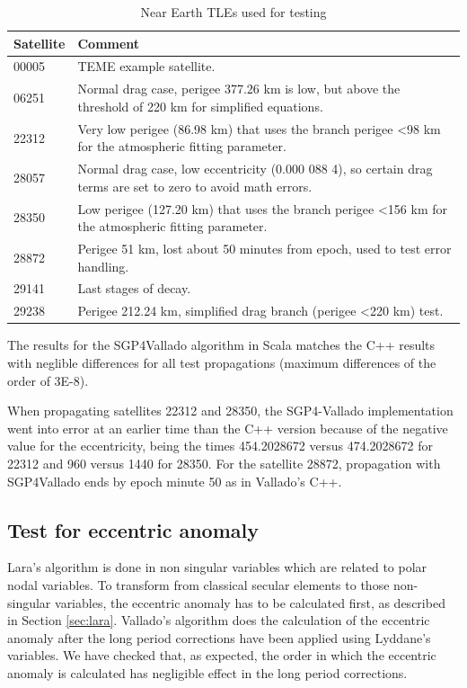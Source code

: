 \documentclass{article}
\begin{document}
\begin{table}[!htbp]
\centering
\caption{Near Earth TLEs used for testing}\vspace{2mm}
\begin{tabular}{ll}
\hline
Satellite & Comment \\
\hline
00005 & TEME example satellite.\\
06251 & Normal drag case, perigee 377.26 km is low, but above the threshold of 220 km for simplified equations.\\
22312 & Very low perigee (86.98 km) that uses the branch perigee \textless 98 km for the atmospheric fitting parameter.\\
28057 & Normal drag case, low eccentricity (0.000 088 4), so certain drag terms are set to zero to avoid math errors.\\
28350 & Low perigee (127.20 km) that uses the branch perigee \textless 156 km for the atmospheric fitting parameter.\\
28872 & Perigee 51 km, lost about 50 minutes from epoch, used to test error handling.\\
29141 & Last stages of decay.\\
29238 & Perigee 212.24 km, simplified drag branch (perigee \textless 220 km) test.\\
\hline
\end{tabular}
\label{tab:res}
\end{table}

The results for the SGP4Vallado algorithm in Scala matches the C++ results with neglible differences for all test propagations (maximum differences of the order of 3E-8).

When propagating satellites 22312 and 28350, the SGP4-Vallado implementation went into error at an earlier time
than the C++ version because of the negative value for the eccentricity, being the times 454.2028672 versus 474.2028672 for 22312 and 960 versus 1440 for 28350.
For the satellite 28872, propagation with SGP4Vallado ends by epoch minute 50 as in Vallado's C++.

\subsection{Test for eccentric anomaly}
\label{sec:trueanomaly}

Lara's algorithm is done in non singular variables which are related to polar nodal variables.
To transform from classical secular elements to those non-singular variables, the eccentric anomaly has to be calculated first, as described in Section \ref{sec:lara}.
Vallado's algorithm does the calculation of the eccentric anomaly after the long period corrections have been applied using Lyddane's variables.
We have checked that, as expected, the order in which the eccentric anomaly is calculated has negligible effect in the long period corrections.
\end{document}
